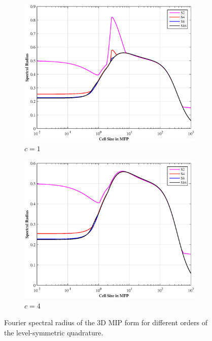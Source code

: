 \documentclass[preprint,review,12pt]{elsarticle}
\begin{document}
\begin{figure}
\centering
	\begin{subfigure}[b]{0.49\textwidth}
		\centering
		\includegraphics[width=0.975\textwidth]{figures/SI_MIP_hex_C=1_PWLD_LS.eps}
		\caption{$c=1$}
	\end{subfigure}
	\hfill
	\begin{subfigure}[b]{0.49\textwidth}
		\centering
		\includegraphics[width=0.975\textwidth]{figures/SI_MIP_hex_C=4_PWLD_LS.eps}
		\caption{$c=4$}
	\end{subfigure}
\caption{Fourier spectral radius of the 3D MIP form for different orders of the level-symmetric quadrature.}
\label{fig::DSA_3D1G_Fourier}
\end{figure}
\end{document}
